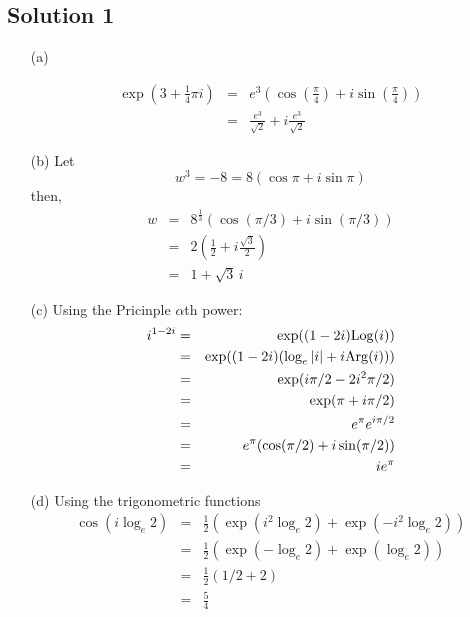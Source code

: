 \subsection*{Solution 1}

\begin{itemize}
\item[(a)]

\begin{eqnarray*}
\exp(3+\frac{1}{4}\pi i)
	&=& e^3 \left( \cos \left(\frac{\pi}{4}\right) + i \sin \left(\frac{\pi}{4}\right) \right) \\
	&=& \frac{e^3}{\sqrt{2}} + i\frac{e^3}{\sqrt{2}}
\end{eqnarray*}

\item[(b)]
Let
\[ w^3 = -8 = 8( \cos\pi + i\sin\pi ) \]
then, 
\begin{eqnarray*}
w	&=& 8^\frac{1}{3} ( \cos ( \pi/3 ) + i \sin ( \pi/3 ) ) \\
	&=& 2 \left( \frac{1}{2} + i \frac{\sqrt{3}}{2} \right) \\
	&=& 1 + \sqrt{3}\,i
\end{eqnarray*}

\item[(c)]
Using the Pricinple $\alpha$th power:
\begin{eqnarray*}
i^{1-2i}
	&=& \exp( (1-2i) {\rm Log}(i)) \\
	&=& \exp( (1-2i) (\log_e|i| + i{\rm Arg}(i) ) ) \\
	&=& \exp( i\pi/2 - 2i^2\pi/2 ) \\
	&=& \exp( \pi + i\pi/2 ) \\
	&=& e^\pi e^{i\pi/2} \\
	&=& e^\pi ( \cos(\pi/2) + i\sin(\pi/2) ) \\
	&=& ie^\pi
\end{eqnarray*}

\item[(d)]
Using the trigonometric functions
\begin{eqnarray*}
\cos(i\log_e 2)
	&=& \frac{1}{2} \left( \exp(i^2\log_e 2) + \exp(-i^2\log_e 2) \right) \\
	&=& \frac{1}{2} \left( \exp(-\log_e 2) + \exp(\log_e 2) \right) \\
	&=& \frac{1}{2} \left( 1/2 + 2 \right) \\
	&=& \frac{5}{4}
\end{eqnarray*}

\end{itemize}

